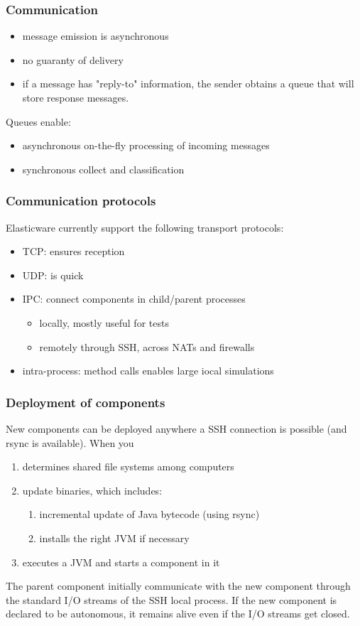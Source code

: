 \documentclass[11pt]{beamer}
\begin{document}
\begin{frame}
\frametitle{Communication}
\begin{itemize}
	\item message emission is asynchronous
	\item no guaranty of delivery
	\item if a message has "reply-to" information, the sender obtains a queue that will store response messages.
\end{itemize}
Queues enable:
\begin{itemize}
	\item asynchronous on-the-fly  processing of incoming messages
	\item synchronous collect and classification
\end{itemize}
\end{frame}


\begin{frame}
\frametitle{Communication protocols}
Elasticware currently support the following transport protocols:
\begin{itemize}
	\item TCP: ensures reception
	\item UDP: is quick
	\item IPC: connect components in child/parent processes
		\begin{itemize}
			\item locally, mostly useful for tests
			\item remotely through SSH, across NATs and firewalls
		\end{itemize}
	\item intra-process: method calls enables large iocal simulations
\end{itemize}
\end{frame}


\begin{frame}
\frametitle{Deployment of components}
New components can be deployed anywhere a SSH connection is possible (and rsync is available). When you 
\begin{enumerate}
	\item determines shared file systems among computers
	\item update binaries, which includes:
		\begin{enumerate}
			\item incremental update of Java  bytecode (using rsync)
			\item installs the right JVM if necessary
		\end{enumerate}
	\item executes a JVM  and starts a component in it
\end{enumerate}
The parent component initially communicate with the new component through the standard I/O streams of the SSH local process. If the new component is declared to be autonomous, it remains alive even if the I/O streams get closed.
\end{frame}
\end{document}
